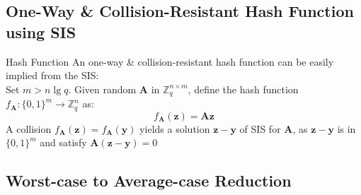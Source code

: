 \documentclass{beamer}
\begin{document}
	\subsection{One-Way \& Collision-Resistant Hash Function using SIS}
	\begin{frame}{Hash Function}
		An one-way \& collision-resistant hash function can be easily implied from the SIS:\\
		Set $m>n\lg{q}$. Given random $\mathbf{A}$ in $\mathbb{Z}^{n\times m}_q$, define the hash function $f_{\mathbf{A}}:\{0,1\}^m\rightarrow \mathbb{Z}^n_q$ as:
		\begin{equation}
			f_{\mathbf{A}}(\mathbf{z})=\mathbf{A}\mathbf{z}
		\end{equation}
		A collision $f_{\mathbf{A}}(\mathbf{z})=f_{\mathbf{A}}(\mathbf{y})$ yields a solution $\mathbf{z}-\mathbf{y}$ of SIS for $\mathbf{A}$, as $\mathbf{z}-\mathbf{y}$ is in $\{0,1\}^m$ and satisfy $\mathbf{A}(\mathbf{z}-\mathbf{y})=0$
	\end{frame}
	\subsection{Worst-case to Average-case Reduction}
\end{document}
